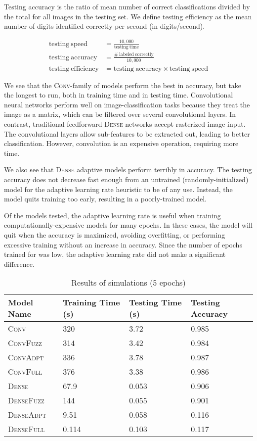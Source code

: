\documentclass{article}
\begin{document}
Testing accuracy is the ratio of mean number of correct classifications divided by the total
for all images in the testing set.
We define testing efficiency as the mean number of digits identified correctly per second (in digits/second).

\begin{align}
  \mathrm{testing~speed} &= \frac{10,000}{\mathrm{testing~time}} \\
  \mathrm{testing~accuracy} &= \frac{\mathrm{\#~labeled~correctly}}{10,000} \\
  \mathrm{testing~efficiency} &= \mathrm{testing~accuracy} \times \mathrm{testing~speed}
\end{align}

We see that the \textsc{Conv}-family of models perform the best in accuracy,
but take the longest to run, both in training time and in testing time.
Convolutional neural networks perform well on image-classification tasks
because they treat the image as a matrix, which can be filtered over several convolutional layers.
In contrast, traditional feedforward \textsc{Dense} networks accept rasterized image input.
The convolutional layers allow sub-features to be extracted out, leading to better classification.
However, convolution is an expensive operation, requiring more time.

We also see that \textsc{Dense} adaptive models perform terribly in accuracy.
The testing accuracy does not decrease fast enough from an untrained (randomly-initialized) model
for the adaptive learning rate heuristic to be of any use.
Instead, the model quits training too early, resulting in a poorly-trained model.

Of the models tested, the adaptive learning rate is useful when training computationally-expensive
models for many epochs.
In these cases, the model will quit when the accuracy is maximized,
avoiding overfitting, or performing excessive training without an increase in accuracy.
Since the number of epochs trained for was low, the adaptive learning rate
did not make a significant difference.

\begin{table}[h]
  \caption{Results of simulations (5 epochs)}
  \label{tbl:results}
  \centering
  \begin{tabular}{llll}
    \toprule
    Model Name & Training Time (s) & Testing Time (s) & Testing Accuracy \\
    \midrule
    \textsc{Conv}         & 320 & 3.72 & 0.985 \\
    \textsc{ConvFuzz}     & 314 & 3.42 & 0.984 \\
    \textsc{ConvAdpt}     & 336 & 3.78 & 0.987 \\
    \textsc{ConvFull}     & 376 & 3.38 & 0.986 \\
    \textsc{Dense}        & 67.9 & 0.053 & 0.906 \\
    \textsc{DenseFuzz}    & 144 & 0.055 & 0.901 \\
    \textsc{DenseAdpt}    & 9.51 & 0.058 & 0.116 \\
    \textsc{DenseFull}    & 0.114 & 0.103 & 0.117 \\
    \bottomrule
  \end{tabular}
\end{table}
\end{document}
